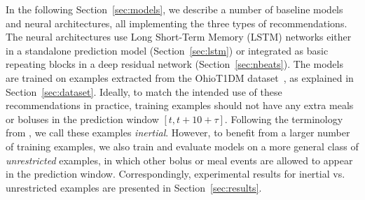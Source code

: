 \documentclass[journal,article,submit,moreauthors,pdftex]{Definitions/mdpi}
\begin{document}
In the following Section~\ref{sec:models}, we describe a number of baseline models and neural architectures, all implementing the three types of recommendations. The neural architectures use Long Short-Term Memory (LSTM) networks either in a standalone prediction model (Section~\ref{sec:lstm}) or integrated as basic repeating blocks in a deep residual network (Section~\ref{sec:nbeats}). The models are trained on examples extracted from the OhioT1DM dataset~\cite{ohiot1dm:marling:kdh18}, as explained in Section~\ref{sec:dataset}. Ideally, to match the intended use of these recommendations in practice, training examples should not have any extra meals or boluses in the prediction window $[t, t + 10 + \tau]$. Following the terminology from \cite{mirshekarian:embc19}, we call these examples {\it inertial}. However, to benefit from a larger number of training examples, we also train and evaluate models on a more general class of {\it unrestricted} examples, in which other bolus or meal events are allowed to appear in the prediction window. Correspondingly, experimental results for inertial vs. unrestricted examples are presented in Section~\ref{sec:results}. 



\end{document}
